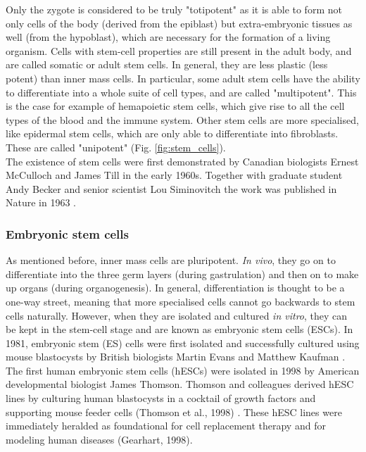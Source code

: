 Only the zygote is considered to be truly "totipotent" as it is able to form not only cells of the body (derived from the epiblast) but extra-embryonic tissues as well (from the hypoblast), which are necessary for the formation of a living organism.
Cells with stem-cell properties are still present in the adult body, and are called somatic or adult stem cells.
In general, they are less plastic (less potent) than inner mass cells.
In particular, some adult stem cells have the ability to differentiate into a whole suite of cell types, and are called "multipotent".
This is the case for example of hemapoietic stem cells, which give rise to all the cell types of the blood and the immune system.
Other stem cells are more specialised, like epidermal stem cells, which are only able to differentiate into fibroblasts.
These are called "unipotent" (Fig. \ref{fig:stem_cells}).\\

The existence of stem cells were first demonstrated by Canadian biologists Ernest McCulloch and James Till in the early 1960s.
Together with graduate student Andy Becker and senior scientist Lou Siminovitch the work was published in Nature in 1963 \cite{becker1963cytological}.


\subsubsection{Embryonic stem cells}

As mentioned before, inner mass cells are pluripotent.
\textit{In vivo}, they go on to differentiate into the three germ layers (during gastrulation) and then on to make up organs (during organogenesis).
In general, differentiation is thought to be a one-way street, meaning that more specialised cells cannot go backwards to stem cells naturally.
However, when they are isolated and cultured \textit{in vitro}, they can be kept in the stem-cell stage and are known as embryonic stem cells (ESCs).
In 1981, embryonic stem (ES) cells were first isolated and successfully cultured using mouse blastocysts by British biologists Martin Evans and Matthew Kaufman \cite{evans1981establishment, martin1981isolation}.
The first human embryonic stem cells (hESCs) were isolated in 1998 by American developmental biologist James Thomson.
Thomson and colleagues derived hESC lines by culturing human blastocysts in a cocktail of growth factors and supporting mouse feeder cells (Thomson et al., 1998) \cite{thomson1998embryonic}. 
These hESC lines were immediately heralded as foundational for cell replacement therapy and for modeling human diseases (Gearhart, 1998).
\cite{saha2009technical}

